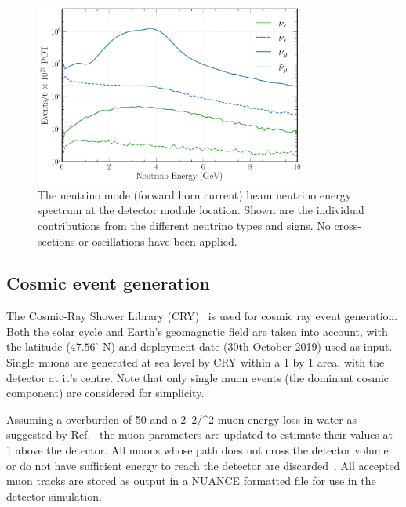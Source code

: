 \begin{figure} %
    \includegraphics[width=0.8\textwidth]{diagrams/4-chips/flux.pdf}
    \caption[\numi neutrino flux at at the \chipsfive detector location]
    {The neutrino mode (forward horn current) \numi beam neutrino energy spectrum at the
        \chipsfive detector module location. Shown are the individual contributions from the
        different neutrino types and signs. No cross-sections or oscillations have been applied.}
    \label{fig:flux}
\end{figure}

\subsection{Cosmic event generation} %
\label{sec:chips_monte_carlo_cosmic} %

The Cosmic-Ray Shower Library (CRY)~\cite{hagmann2012_1, hagmann2012_2} is used for cosmic ray
event generation. Both the solar cycle and Earth's geomagnetic field are taken into account, with
the \mbox{\chipsfive} latitude ($47.56^{\circ}$ N) and deployment date (30th October 2019) used as
input. Single muons are generated at sea level by CRY within a \unit{1}{} by
\unit{1}{} area, with the detector at it's centre. Note that only single muon events (the
dominant cosmic component) are considered for simplicity.

Assuming a \chipsfive overburden of \unit{50}{} and a \unit{2.2}{\MeV/^{2}} muon
energy loss in water as suggested by Ref.~\cite{klimushin2001} the muon parameters are updated to
estimate their values at \unit{1}{} above the detector. All muons whose path does not
cross the detector volume or do not have sufficient energy to reach the detector are
discarded~\cite{chipsgen2020}. All accepted muon tracks are stored as output in a NUANCE formatted
file for use in the detector simulation.

